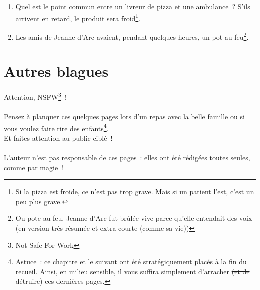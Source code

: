 \documentclass[10pt,a5paper,fullpage]{book}
\begin{document}
\begin{enumerate}
		\item Quel est le point commun entre un livreur de pizza et une ambulance~? S’ils arrivent en retard, le produit sera froid\footnote{Si la pizza est froide, ce n'est pas trop grave. Mais si un patient l'est, c'est un peu plus grave.}. 
		\item Les amis de Jeanne d'Arc avaient, pendant quelques heures, un pot-au-feu\footnote{Ou pote au feu. Jeanne d'Arc fut brûlée vive parce qu'elle entendait des voix (en version très résumée et extra courte \sout{(comme sa vie)})}. 
	\end{enumerate}
	
	\chapter{Autres blagues}
	Attention, NSFW\footnote{Not Safe For Work}~! \\ \\
	Pensez à planquer ces quelques pages lors d'un repas avec la belle famille ou si vous voulez faire rire des enfants\footnote{Astuce~: ce chapitre et le suivant ont été stratégiquement placés à la fin du recueil. Ainsi, en milieu sensible, il vous suffira simplement d'arracher \sout{(et de détruire)} ces dernières pages.}. \\Et faites attention au public ciblé~! 
	\\ \\L'auteur n'est pas responsable de ces pages~: elles ont été rédigées toutes seules, comme par magie~!
	\newpage
\end{document}
